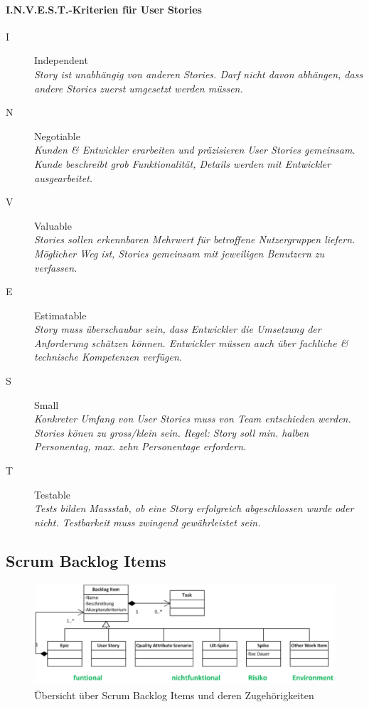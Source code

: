 \documentclass[a4paper]{article}
\begin{document}
				\paragraph{I.N.V.E.S.T.-Kriterien für User Stories}
				
					\begin{description}
						\item[I] Independent\\
							\textit{Story ist unabhängig von anderen Stories.
							Darf nicht davon abhängen, dass andere Stories zuerst umgesetzt werden müssen.}
						\item[N] Negotiable\\
							\textit{Kunden \& Entwickler erarbeiten und präzisieren User Stories gemeinsam.
							Kunde beschreibt grob Funktionalität, Details werden mit Entwickler ausgearbeitet.}
						\item[V] Valuable\\
							\textit{Stories sollen erkennbaren Mehrwert für betroffene Nutzergruppen liefern.
							Möglicher Weg ist, Stories gemeinsam mit jeweiligen Benutzern zu verfassen.}
						\item[E] Estimatable\\
							\textit{Story muss überschaubar sein, dass Entwickler die Umsetzung der Anforderung schätzen können.
							Entwickler müssen auch über fachliche \& technische Kompetenzen verfügen.}
						\item[S] Small\\
							\textit{Konkreter Umfang von User Stories muss von Team entschieden werden.
							Stories könen zu gross/klein sein.
							Regel: Story soll min. halben Personentag, max. zehn Personentage erfordern.}
						\item[T] Testable\\
							\textit{Tests bilden Massstab, ob eine Story erfolgreich abgeschlossen wurde oder nicht.
							Testbarkeit muss zwingend gewährleistet sein.}
					\end{description}
		
\newpage

		\subsection{Scrum Backlog Items}
		
		\begin{figure}[!htb]
			\centering
			\includegraphics[width=.6\textwidth]{img/re/05/backlog_items.png}
			\caption{Übersicht über Scrum Backlog Items und deren Zugehörigkeiten}
			\label{fig:re_backlog_items}
		\end{figure}
			
\end{document}
